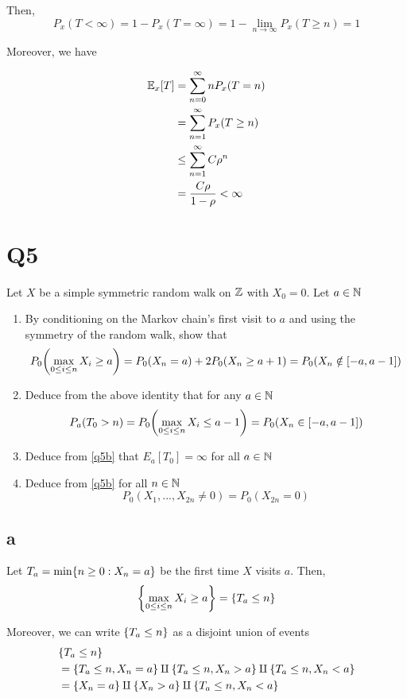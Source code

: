 \documentclass{article}
\begin{document}
Then,
$$
    P_x(T < \infty) = 1 - P_x(T = \infty) = 1 - \lim_{n \to \infty} P_x(T \geq n) = 1
$$

Moreover, we have

\begin{align*}
    \Exp_x[T]
    &= \sum_{n=0}^\infty n P_x(T=n) \\
    &= \sum_{n=1}^\infty P_x(T \geq n) \\
    &\leq \sum_{n=1}^\infty C \rho^n \\
    &= \frac{C \rho}{1-\rho} < \infty
\end{align*}

\section{Q5}

Let $X$ be a simple symmetric random walk on $\Z$ with $X_0 = 0$. Let $a \in \N$
\begin{enumerate}[label=(\alph*)]
    \item By conditioning on the Markov chain's first visit to $a$ and using the symmetry of the random walk, show that
    $$
        P_0\tuple*{\max_{0 \leq i \leq n} X_i \geq a} = P_0(X_n = a) + 2 P_0(X_n \geq a+1) = P_0(X_n \notin [-a, a-1])
    $$

    \item \label{q5b} Deduce from the above identity that for any $a \in \N$
    $$
        P_a(T_0 > n) = P_0\tuple*{\max_{0 \leq i \leq n} X_i \leq a-1} = P_0(X_n \in [-a, a-1])
    $$

    \item Deduce from \ref{q5b} that $E_a[T_0] = \infty$ for all $a \in \N$

    \item Deduce from \ref{q5b} for all $n \in \N$
    $$
        P_0(X_1, ..., X_{2n} \neq 0) = P_0(X_{2n} = 0)
    $$
\end{enumerate}

\subsection{a}

Let $T_a = \min \set{n \geq 0: X_n = a}$ be the first time $X$ visits $a$. Then,
$$
    \set*{\max_{0 \leq i \leq n} X_i \geq a} = \set*{T_a \leq n}
$$

Moreover, we can write $\set*{T_a \leq n}$ as a disjoint union of events
\begin{align*}
    &\set*{T_a \leq n} \\
    &= \set*{T_a \leq n, X_n = a} \amalg \set*{T_a \leq n, X_n > a} \amalg \set*{T_a \leq n, X_n < a} \\
    &= \set{X_n = a} \amalg \set{X_n > a} \amalg \set*{T_a \leq n, X_n < a} \\
\end{align*}
\end{document}
